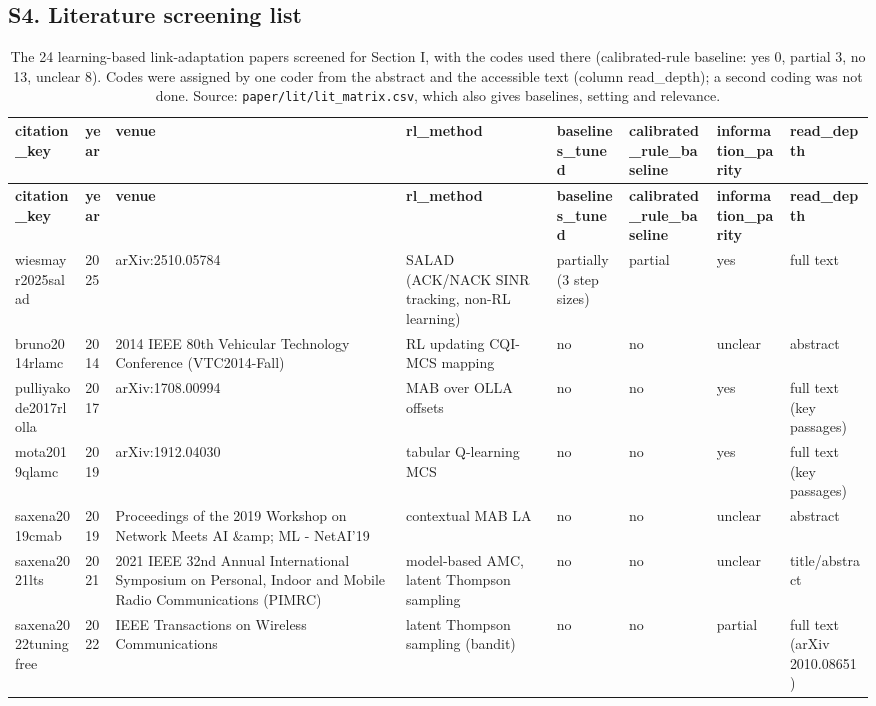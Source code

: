 \documentclass[10pt]{article}
\begin{document}
\begin{landscape}
\section{S4. Literature screening list}
\tiny
\setlength{\tabcolsep}{2pt}
\begin{longtable}{@{}llllllll@{}}
\caption{The 24 learning-based link-adaptation papers screened for Section I, with the codes used there (calibrated-rule baseline: yes 0, partial 3, no 13, unclear 8). Codes were assigned by one coder from the abstract and the accessible text (column read\_depth); a second coding was not done. Source: \texttt{paper/lit/lit\_matrix.csv}, which also gives baselines, setting and relevance.}\\
\toprule
\textbf{citation\_key} & \textbf{year} & \textbf{venue} & \textbf{rl\_method} & \textbf{baselines\_tuned} & \textbf{calibrated\_rule\_baseline} & \textbf{information\_parity} & \textbf{read\_depth} \\
\midrule
\endfirsthead
\toprule
\textbf{citation\_key} & \textbf{year} & \textbf{venue} & \textbf{rl\_method} & \textbf{baselines\_tuned} & \textbf{calibrated\_rule\_baseline} & \textbf{information\_parity} & \textbf{read\_depth} \\
\midrule
\endhead
wiesmayr2025salad & 2025 & arXiv:2510.05784 & SALAD (ACK/NACK SINR tracking, non-RL learning) & partially (3 step sizes) & partial & yes & full text \\
bruno2014rlamc & 2014 & 2014 IEEE 80th Vehicular Technology Conference (VTC2014-Fall) & RL updating CQI-MCS mapping & no & no & unclear & abstract \\
pulliyakode2017rlolla & 2017 & arXiv:1708.00994 & MAB over OLLA offsets & no & no & yes & full text (key passages) \\
mota2019qlamc & 2019 & arXiv:1912.04030 & tabular Q-learning MCS & no & no & yes & full text (key passages) \\
saxena2019cmab & 2019 & Proceedings of the 2019 Workshop on Network Meets AI \&amp; ML  - NetAI'19 & contextual MAB LA & no & no & unclear & abstract \\
saxena2021lts & 2021 & 2021 IEEE 32nd Annual International Symposium on Personal, Indoor and Mobile Radio Communications (PIMRC) & model-based AMC, latent Thompson sampling & no & no & unclear & title/abstract \\
saxena2022tuningfree & 2022 & IEEE Transactions on Wireless Communications & latent Thompson sampling (bandit) & no & no & partial & full text (arXiv 2010.08651) \\

\end{longtable}
\end{landscape}
\end{document}
